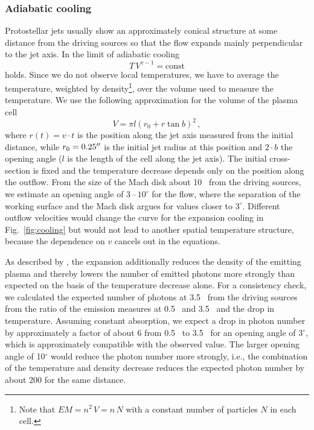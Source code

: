 \subsubsection{Adiabatic cooling\label{sect:aCooling}}
Protostellar jets usually show an approximately conical structure at some distance from the driving sources so that the flow expands mainly perpendicular to the jet axis.
In the limit of adiabatic cooling
\begin{equation}
T\,V^{\gamma-1} = \mbox{const}
\end{equation}
holds. Since we do not observe local temperatures, we have to average the temperature, weighted by density\footnote{Note that $EM=n^2\,V=n\,N$ with a constant number of particles $N$ in each cell.}, over the volume used to measure the temperature. We use the following approximation for the volume of the plasma cell
\begin{equation}
V=\pi l\left(r_0+r\tan b \right)^2\,,
\end{equation}
where $r(t)=v\cdot t$ is the position along the jet axis measured from the initial distance, while $r_0=0.25\hbox{$^{\prime\prime}$}$ is the initial jet radius at this position and $2\cdot b$ the opening angle ($l$ is the length of the cell along the jet axis).
The initial cross-section is fixed and the temperature decrease depends only on the position along the outflow.
From the size of the Mach disk about 10\arcsec~ from the driving sources, we estimate an opening angle of $3$\,--\,$10^\circ$ for the flow, where the separation of the working surface and the Mach disk argues for values closer to $3^\circ$.
Different outflow velocities would change the curve for the expansion cooling in Fig.~\ref{fig:cooling} but would not lead to another spatial temperature structure, because the dependence on $v$ cancels out in the equations.

As described by \citet{Guedel_2008}, the expansion additionally reduces the density of the emitting plasma and thereby lowers the number of emitted photons more strongly than expected on the basis of the temperature decrease alone. For a consistency check, we calculated the expected number of photons at 3.5\arcsec~ from the driving sources from the ratio of the emission measures at 0.5\arcsec~ and 3.5\arcsec~ and the drop in temperature. Assuming constant absorption, we expect a drop in photon number by approximately a factor of about 6 from 0.5\arcsec~ to 3.5\arcsec~ for an opening angle of 3$^\circ$, which is approximately compatible with the observed value. The larger opening angle of 10$^\circ$ would reduce the photon number more strongly, i.e., the combination of the temperature and  density decrease reduces the expected photon number by about 200 for the same distance.


